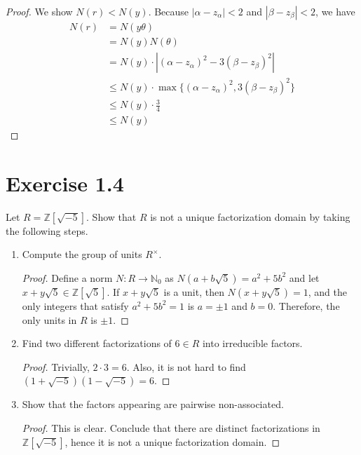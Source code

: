\documentclass[a4paper]{article}
\begin{document}
\begin{proof}
  We show \(N(r) < N(y)\). Because \(|\alpha - z_\alpha| < 2\) and \(|\beta - z_\beta| < 2\), we have
  \begin{align*}
    N(r) &= N(y \theta) \\
    &= N(y) N(\theta) \\
    &= N(y) \cdot |(\alpha - z_\alpha)^2 - 3 (\beta - z_\beta)^2| \\
    &\leq N(y) \cdot \max\{(\alpha - z_\alpha)^2, 3 (\beta - z_\beta)^2\} \\
    &\leq N(y) \cdot \frac{3}{4} \\
    &\leq N(y)
  \end{align*}
\end{proof}
\newpage
\section*{Exercise 1.4}
Let \(R = \mathbb{Z}[\sqrt{-5}]\). Show that \(R\) is not a unique factorization domain by taking the following steps.
\begin{enumerate}
  \item Compute the group of units \(R^\times\).
  \begin{proof}
    Define a norm \(N: R \longrightarrow \mathbb{N}_0\) as \(N(a + b\sqrt{5}) = a^2 + 5b^2\) and let \(x + y \sqrt{5} \in \mathbb{Z}[\sqrt{5}]\). If \(x + y \sqrt{5}\) is a unit, then \(N(x + y \sqrt{5}) = 1\), and the only integers that satisfy \(a^2 + 5b^2 = 1\) is \(a = \pm 1\) and \(b = 0\). Therefore, the only units in \(R\) is \(\pm 1\).
  \end{proof}
  \item Find two different factorizations of \(6 \in R\) into irreducible factors.
  \begin{proof}
    Trivially, \(2 \cdot 3 = 6\). Also, it is not hard to find \((1 + \sqrt{-5})(1 - \sqrt{-5}) = 6\).
  \end{proof}
  \item Show that the factors appearing are pairwise non-associated.
  \begin{proof}
    This is clear. Conclude that there are distinct factorizations in \(\mathbb{Z}[\sqrt{-5}]\), hence it is not a unique factorization domain.
  \end{proof}
\end{enumerate}
\newpage
\end{document}
